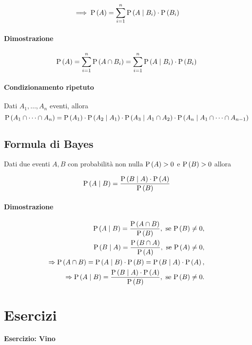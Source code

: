\[ \implies  \prob{A} = \sum_{i=1}^{n} \prob{A \mid B_i} \cdot \prob{B_i} \]

\paragraph{Dimostrazione} 

\[ \prob{A} =  \sum_{i=1}^{n} \prob{A \cap B_i} = \sum_{i=1}^{n} \prob{A \mid B_i} \cdot \prob{B_i} \]

\paragraph{Condizionamento ripetuto}
Dati $ A_1, \dots, A_n $ eventi, allora 
\[ \prob{A_1 \cap \dots \cap A_n} = \prob{A_1} \cdot \prob{A_2 \mid A_1} \cdot \prob{A_3 \mid  A_1 \cap A_2} \cdot \prob{A_n  \mid  A_1 \cap \dots \cap A_{n-1}}\]

\subsection{Formula di Bayes}


Dati due eventi $ A,B $ con probabilità non nulla $ \prob{A} > 0 $ e $ \prob{B} > 0 $ allora 

\[ \prob{A \mid B} = \dfrac{\p{B \mid A} \cdot \p{A} }{\p{B}}\]

\paragraph{Dimostrazione}

\[\begin{aligned}
	\p{A \mid B} = \frac{\p{A\cap B}}{\p{B}}, \text{ se } \p{B} \neq 0, \\
	\p{B \mid A} = \frac{\p{B\cap A}}{\p{A}}, \text{ se } \p{A} \neq 0, \\
	\Rightarrow \p{A\cap B} =  \p{A\mid B}\cdot \p{B}=\p{B\mid A}\cdot \p{A}, \\
	\Rightarrow \p{A \mid B} =  \frac{\p{B \mid A}  \cdot \p{A}} {\p{B}}, \text{ se } \p{B} \neq 0.
\end{aligned}\]

\section{Esercizi}

\paragraph{Esercizio: Vino}

